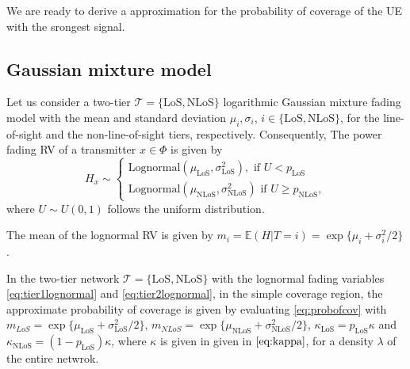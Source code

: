 \documentclass[conference]{IEEEtran}
\theoremstyle{definition}
\theoremstyle{plain}
\begin{document}
          We are ready to derive a approximation for the probability of coverage of the UE with the srongest signal.

            

          \subsection{Gaussian mixture model}
          Let us consider a two-tier $\mathcal{T} = \{\text{LoS},\text{NLoS}\}$ logarithmic Gaussian mixture fading model with the mean and standard deviation $\mu_{i},\sigma_{i}$, $i \in \{\text{LoS},\text{NLoS} \}$, for the line-of-sight and the non-line-of-sight tiers, respectively. Consequently, The power fading RV of a transmitter $x \in \Phi$ is given by
            \begin{equation}
            H_x \sim
            \begin{cases}
               \text{Lognormal}(\mu_{\text{LoS}},\sigma_{\text{LoS}}^2), \text{ if } U<p_{\text{LoS}} \\
               \text{Lognormal}(\mu_{\text{NLoS}},\sigma_{\text{NLoS}}^2)\text{ if } U \geq p_{\text{NLoS}},              \label{eq:tier2lognormal}
            \end{cases}
            \end{equation}
            where $U \sim U(0,1)$ follows the uniform distribution.
            
            The mean of the lognormal RV is given by $ m_i=\mathbb{E}(H|T=i) = \exp \{\mu_i+\sigma_i^2/2\}$.
            
            In the two-tier network $\mathcal{T} =\{\text{LoS}, \text{NLoS}\}$ with the lognormal fading variables \eqref{eq:tier1lognormal} and \eqref{eq:tier2lognormal}, in the simple coverage region, the approximate probability of coverage is given by evaluating \eqref{eq:probofcov} with $m_{LoS}=\exp \{\mu_{\text{LoS}}+\sigma_{\text{LoS}}^2/2\}$, $m_{NLoS}=\exp \{\mu_{\text{NLoS}}+\sigma_{\text{NLoS}}^2/2\}$, $\mathcal{\kappa}_{\text{LoS}} = p_{\text{LoS}}\kappa$ and $\mathcal{\kappa}_{\text{NLoS}}=(1-p_{\text{LoS}})\kappa$, where $\kappa$ is given in given in $\eqref{eq:kappa}$, for a density $\lambda$ of the entire netwrok.
\end{document}
